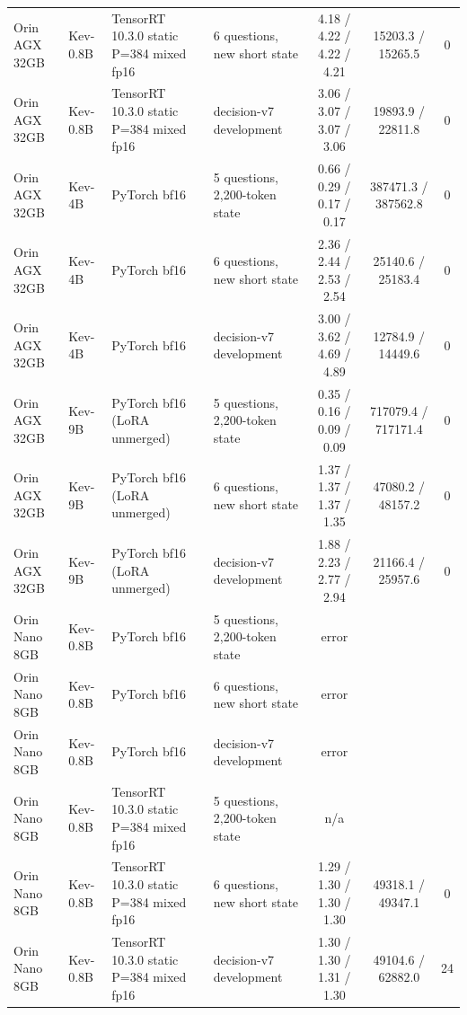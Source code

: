 \begin{table}[!htbp]
{\begin{tabular}{llllcc c}
Orin AGX 32GB & Kev-0.8B & TensorRT 10.3.0 static P=384 mixed fp16 & 6 questions, new short state & 4.18 / 4.22 / 4.22 / 4.21 & 15203.3 / 15265.5 & 0 \\
Orin AGX 32GB & Kev-0.8B & TensorRT 10.3.0 static P=384 mixed fp16 & decision-v7 development & 3.06 / 3.07 / 3.07 / 3.06 & 19893.9 / 22811.8 & 0 \\
Orin AGX 32GB & Kev-4B & PyTorch bf16 & 5 questions, 2,200-token state & 0.66 / 0.29 / 0.17 / 0.17 & 387471.3 / 387562.8 & 0 \\
Orin AGX 32GB & Kev-4B & PyTorch bf16 & 6 questions, new short state & 2.36 / 2.44 / 2.53 / 2.54 & 25140.6 / 25183.4 & 0 \\
Orin AGX 32GB & Kev-4B & PyTorch bf16 & decision-v7 development & 3.00 / 3.62 / 4.69 / 4.89 & 12784.9 / 14449.6 & 0 \\
Orin AGX 32GB & Kev-9B & PyTorch bf16 (LoRA unmerged) & 5 questions, 2,200-token state & 0.35 / 0.16 / 0.09 / 0.09 & 717079.4 / 717171.4 & 0 \\
Orin AGX 32GB & Kev-9B & PyTorch bf16 (LoRA unmerged) & 6 questions, new short state & 1.37 / 1.37 / 1.37 / 1.35 & 47080.2 / 48157.2 & 0 \\
Orin AGX 32GB & Kev-9B & PyTorch bf16 (LoRA unmerged) & decision-v7 development & 1.88 / 2.23 / 2.77 / 2.94 & 21166.4 / 25957.6 & 0 \\
Orin Nano 8GB & Kev-0.8B & PyTorch bf16 & 5 questions, 2,200-token state & error & & \\
Orin Nano 8GB & Kev-0.8B & PyTorch bf16 & 6 questions, new short state & error & & \\
Orin Nano 8GB & Kev-0.8B & PyTorch bf16 & decision-v7 development & error & & \\
Orin Nano 8GB & Kev-0.8B & TensorRT 10.3.0 static P=384 mixed fp16 & 5 questions, 2,200-token state & n/a & & \\
Orin Nano 8GB & Kev-0.8B & TensorRT 10.3.0 static P=384 mixed fp16 & 6 questions, new short state & 1.29 / 1.30 / 1.30 / 1.30 & 49318.1 / 49347.1 & 0 \\
Orin Nano 8GB & Kev-0.8B & TensorRT 10.3.0 static P=384 mixed fp16 & decision-v7 development & 1.30 / 1.30 / 1.31 / 1.30 & 49104.6 / 62882.0 & 24 \\
\bottomrule\end{tabular}}\end{table}


